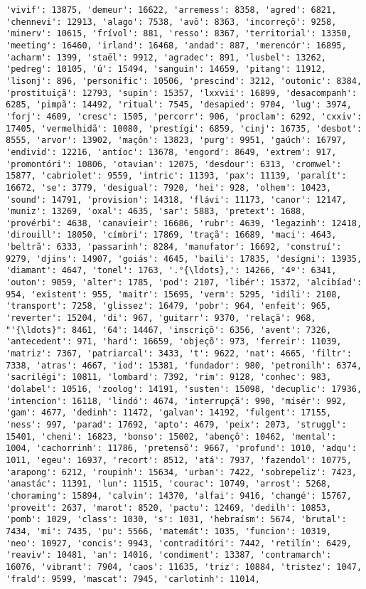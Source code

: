 \documentclass[11pt]{article}
\begin{document}
\begin{Verbatim}[commandchars=\\\{\}]
'vivif': 13875, 'demeur': 16622, 'arremess': 8358, 'agred': 6821, 'chennevi': 12913, 'alago': 7538, 'avô': 8363, 'incorreçõ': 9258, 'minerv': 10615, 'frívol': 881, 'resso': 8367, 'territorial': 13350, 'meeting': 16460, 'irland': 16468, 'andad': 887, 'merencór': 16895, 'acharm': 1399, 'staël': 9912, 'agradec': 891, 'lusbel': 13262, 'pedreg': 10105, 'ú': 15494, 'sanguin': 14659, 'pitang': 11912, 'lisonj': 896, 'personific': 10506, 'prescind': 3212, 'outonic': 8384, 'prostituiçã': 12793, 'supin': 15357, 'lxxvii': 16899, 'desacompanh': 6285, 'pimpã': 14492, 'ritual': 7545, 'desapied': 9704, 'lug': 3974, 'forj': 4609, 'cresc': 1505, 'percorr': 906, 'proclam': 6292, 'cxxiv': 17405, 'vermelhidã': 10080, 'prestígi': 6859, 'cinj': 16735, 'desbot': 8555, 'arvor': 13902, 'maçôn': 13823, 'purg': 9951, 'gaúch': 16797, 'endivid': 12216, 'antíoc': 13678, 'engord': 8649, 'extrem': 917, 'promontóri': 10806, 'otavian': 12075, 'desdour': 6313, 'cromwel': 15877, 'cabriolet': 9559, 'intric': 11393, 'pax': 11139, 'paralít': 16672, 'se': 3779, 'desigual': 7920, 'hei': 928, 'olhem': 10423, 'sound': 14791, 'provision': 14318, 'flávi': 11173, 'canor': 12147, 'muniz': 13269, 'oxal': 4635, 'sar': 5883, 'pretext': 1688, 'provérbi': 4638, 'canavieir': 16686, 'rubr': 4639, 'legazinh': 12418, 'dirouill': 18050, 'címbri': 17869, 'traçã': 16689, 'maci': 4643, 'beltrã': 6333, 'passarinh': 8284, 'manufator': 16692, 'construí': 9279, 'djins': 14907, 'goiás': 4645, 'baili': 17835, 'desígni': 13935, 'diamant': 4647, 'tonel': 1763, '.°{\ldots},': 14266, '4º': 6341, 'outon': 9059, 'alter': 1785, 'pod': 2107, 'libér': 15372, 'alcibíad': 954, 'existent': 955, 'maitr': 15695, 'verm': 5295, 'idíli': 2108, 'transport': 7258, 'glissez': 16479, 'pobr': 964, 'enfeit': 965, 'reverter': 15204, 'di': 967, 'guitarr': 9370, 'relaçã': 968, "'{\ldots}": 8461, '64': 14467, 'inscriçõ': 6356, 'avent': 7326, 'antecedent': 971, 'hard': 16659, 'objeçõ': 973, 'ferreir': 11039, 'matriz': 7367, 'patriarcal': 3433, 't': 9622, 'nat': 4665, 'filtr': 7338, 'atras': 4667, 'iod': 15381, 'fundador': 980, 'petronilh': 6374, 'sacrilégi': 10811, 'lombard': 7392, 'rim': 9128, 'conhec': 983, 'dolabel': 10516, 'zoolog': 14191, 'susten': 15098, 'decuplic': 17936, 'intencion': 16118, 'lindó': 4674, 'interrupçã': 990, 'misér': 992, 'gam': 4677, 'dedinh': 11472, 'galvan': 14192, 'fulgent': 17155, 'ness': 997, 'parad': 17692, 'apto': 4679, 'peix': 2073, 'struggl': 15401, 'cheni': 16823, 'bonso': 15002, 'abençô': 10462, 'mental': 1004, 'cachorrinh': 11786, 'pretensõ': 9667, 'profund': 1010, 'adqu': 1011, 'egeu': 16937, 'recort': 8512, 'atá': 7937, 'fazendol': 10775, 'arapong': 6212, 'roupinh': 15634, 'urban': 7422, 'sobrepeliz': 7423, 'anastác': 11391, 'lun': 11515, 'courac': 10749, 'arrost': 5268, 'choraming': 15894, 'calvin': 14370, 'alfai': 9416, 'changé': 15767, 'proveit': 2637, 'marot': 8520, 'pactu': 12469, 'dedilh': 10853, 'pomb': 1029, 'class': 1030, 's': 1031, 'hebraísm': 5674, 'brutal': 7434, 'mi': 7435, 'pu': 5566, 'matemát': 1035, 'funcion': 10319, 'neo': 10927, 'concis': 9943, 'contraditóri': 7442, 'retilín': 6429, 'reaviv': 10481, 'an': 14016, 'condiment': 13387, 'contramarch': 16076, 'vibrant': 7904, 'caos': 11635, 'triz': 10884, 'tristez': 1047, 'frald': 9599, 'mascat': 7945, 'carlotinh': 11014, 
\end{Verbatim}
\end{document}
